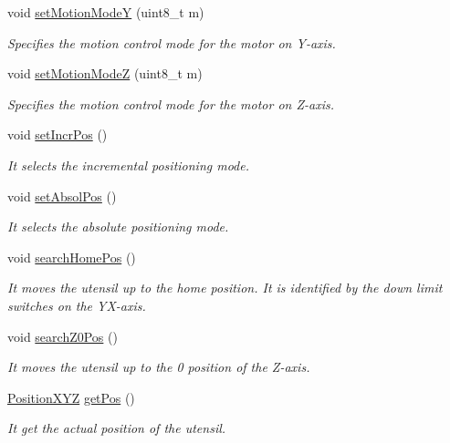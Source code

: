 \begin{DoxyCompactItemize}
void \hyperlink{class_c_n_c___router_a42148bff778d0dbd45b37f7a09b61382}{set\+Motion\+Mode\+Y} (uint8\+\_\+t m)
\begin{DoxyCompactList}\small\item\em Specifies the motion control mode for the motor on Y-\/axis. \end{DoxyCompactList}\item 
void \hyperlink{class_c_n_c___router_a28ddb2544290798664f99ed506f7d44a}{set\+Motion\+Mode\+Z} (uint8\+\_\+t m)
\begin{DoxyCompactList}\small\item\em Specifies the motion control mode for the motor on Z-\/axis. \end{DoxyCompactList}\item 
void \hyperlink{class_c_n_c___router_abbda24db494dd328382639412570978e}{set\+Incr\+Pos} ()
\begin{DoxyCompactList}\small\item\em It selects the incremental positioning mode. \end{DoxyCompactList}\item 
void \hyperlink{class_c_n_c___router_a8629d6232f16d039ff386b0f02d45895}{set\+Absol\+Pos} ()
\begin{DoxyCompactList}\small\item\em It selects the absolute positioning mode. \end{DoxyCompactList}\item 
void \hyperlink{class_c_n_c___router_a4e9504d77eee555ddb35af073b67d3f1}{search\+Home\+Pos} ()
\begin{DoxyCompactList}\small\item\em It moves the utensil up to the home position. It is identified by the down limit switches on the Y\+X-\/axis. \end{DoxyCompactList}\item 
void \hyperlink{class_c_n_c___router_add6b83463be9d4288266fec09e1424f3}{search\+Z0\+Pos} ()
\begin{DoxyCompactList}\small\item\em It moves the utensil up to the 0 position of the Z-\/axis. \end{DoxyCompactList}\item 
\hyperlink{class_position_x_y_z}{Position\+X\+Y\+Z} \hyperlink{class_c_n_c___router_a0fce19a7adf29dc0fb2b1a29c813b953}{get\+Pos} ()
\begin{DoxyCompactList}\small\item\em It get the actual position of the utensil. \end{DoxyCompactList}\item 

\end{DoxyCompactItemize}
